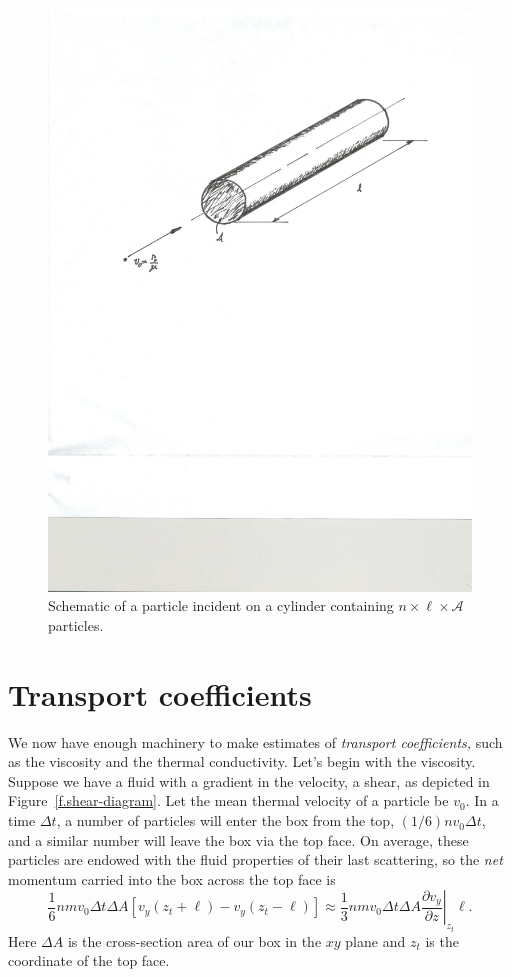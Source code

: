 \begin{figure}[htbp]
\includegraphics[width=\textwidth]{mean-free-path}
\caption{Schematic of a particle incident on a cylinder containing $n\times\ell\times\mathcal{A}$ particles.}
\label{f.mfp}
\end{figure}

\section{Transport coefficients}

We now have enough machinery to make estimates of \emph{transport coefficients,} such as the viscosity and the thermal conductivity. Let's begin with the viscosity.  Suppose we have a fluid with a gradient in the velocity, a shear, as depicted in Figure~\ref{f.shear-diagram}.  Let the mean thermal velocity of a particle be $v_{0}$.  In a time $\Delta t$, a number of particles will enter the box from the top, $(1/6) n v_{0} \Delta t$, and a similar number will leave the box via the top face. On average, these particles are endowed with the fluid properties of their last scattering, so the \emph{net} momentum carried into the box across the top face is
\begin{equation}\label{e.viscosity-1}
 \frac{1}{6} n m v_{0} \Delta t \Delta A \left[v_{y}(z_{t} + \ell) - v_{y}(z_{t}-\ell)\right] \approx \frac{1}{3} n m v_{0} \Delta t\Delta A \left.\frac{\partial v_{y}}{\partial z}\right|_{z_{t}}\ell.
\end{equation}
Here $\Delta A$ is the cross-section area of our box in the $xy$ plane and $z_{t}$ is the coordinate of the top face.

